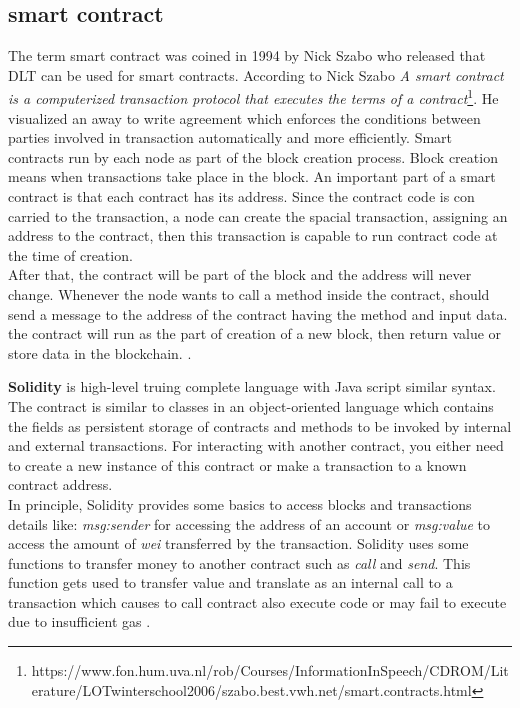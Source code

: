 \subsection{smart contract}
 The term smart contract was coined in 1994 by Nick Szabo who released that DLT can be used for smart contracts. 
According to Nick Szabo \textit{A smart contract is a computerized transaction protocol that executes the terms of  a contract}\footnote{https://www.fon.hum.uva.nl/rob/Courses/InformationInSpeech/CDROM/Literature/LOTwinterschool2006/szabo.best.vwh.net/smart.contracts.html}. He visualized an away to write agreement which enforces the conditions between parties involved in transaction automatically and more efficiently.
Smart contracts run by each node as part of the block creation process. Block creation means when transactions take place in the block.
An important part of a smart contract is that each contract has its address. Since the contract code is con carried to the transaction, a node can create the spacial transaction, assigning an address to the contract, then this transaction is capable to run contract code at the time of creation.\\
After that, the contract will be part of the block and the address will never change. Whenever the node wants to call a method inside the contract, should send a message to the address of the contract having the method and input data.
the contract will run as the part of creation of a new block, then return value or store data in the blockchain. \cite{Payrott}.

\textbf{Solidity} is high-level truing complete language with Java script similar syntax. The contract is similar to classes in an object-oriented language which contains the fields as persistent storage of contracts and methods to be invoked by internal and external transactions. For interacting with another contract, you either need to create a new instance of this contract or make a transaction to a known contract address.\\
In principle, Solidity provides some basics to access blocks and transactions details like: \textit{msg:sender} for accessing the address of an account or \textit{msg:value} to access the amount of \textit{wei} transferred by the transaction. Solidity uses some functions to transfer money to another contract such as \textit{call} and \textit{send}. This function gets used to transfer value and translate as an internal call to a transaction which causes to call contract also execute code or may fail to execute due to insufficient gas \cite{Ilya}.

